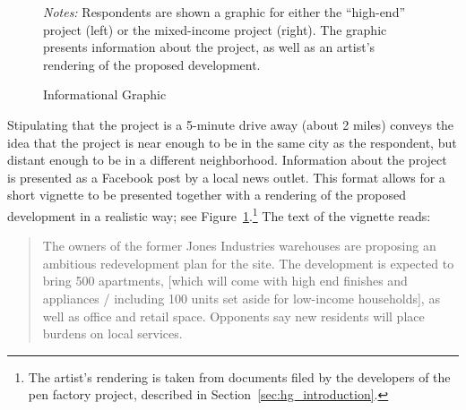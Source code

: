 \documentclass[article,12pt]{memoir}
\begin{document}
\begin{figure}[t] 
  \caption{Informational Graphic}
  \label{fig:hg_e_treatment}  
  \begin{measuredfigure}
  \end{measuredfigure}
  \begin{tablenotes}[flushleft]
    \item \hspace{-.2em}\emph{Notes:} Respondents are shown a graphic for either the ``high-end'' project (left) or the mixed-income project (right). The graphic presents information about the project, as well as an artist's rendering of the proposed development.
  \end{tablenotes}
\end{figure}

\noindent Stipulating that the project is a 5-minute drive away (about 2 miles) conveys the idea that the project is near enough to be in the same city as the respondent, but distant enough to be in a different neighborhood. Information about the project is presented as a Facebook post by a local news outlet.  This format allows for a short vignette to be presented together with a rendering of the proposed development in a realistic way; see Figure~\ref{fig:hg_e_treatment}.\footnote{The artist's rendering is taken from documents filed by the developers of the pen factory project, described in Section~\ref{sec:hg_introduction}.}  The text of the vignette reads:

  \begin{quote}
  \begin{SingleSpace}
  The owners of the former Jones Industries warehouses are proposing an ambitious redevelopment plan for the site. The development is expected to bring 500 apartments, [which will come with high end finishes and appliances / including 100 units set aside for low-income households], as well as office and retail space. Opponents say new residents will place burdens on local services.\end{SingleSpace}
  \end{quote}
\end{document}
